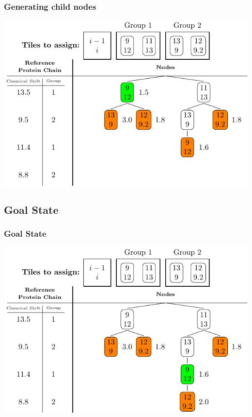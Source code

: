 \documentclass{beamer}
\begin{document}
\begin{frame}
	\frametitle{Generating child nodes} 
	\vspace{-.5cm} 
	\center
	\includegraphics[width=.9\textwidth]{tilePlacement/step6}
\end{frame}

\subsection{Goal State}
\begin{frame}
	\frametitle{Goal State}
	\vspace{-.5cm} 
	\center
	\includegraphics[width=.9\textwidth]{tilePlacement/step7}
\end{frame}
\end{document}
